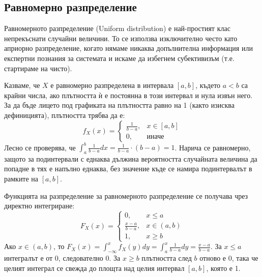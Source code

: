 \documentclass{article}
\begin{document}
\subsection{Равномерно разпределение}

Равномерното разпределение (Uniform distribution) е най-простият клас непрекъснати случайни величини. То се използва изключително често като априорно разпределение, когато нямаме никаква допълнителна информация или експертни познания за системата и искаме да избегнем субективизъм (т.е. стартираме на чисто).

Казваме, че $X$ е равномерно разпределена в интервала $[a, b]$, където $a < b$ са крайни числа, ако плътността ѝ е постоянна в този интервал и нула извън него. За да бъде лицето под графиката на плътността равно на 1 (както изисква дефиницията), плътността трябва да е:
\[
f_X(x) = \begin{cases} 
\frac{1}{b-a}, & x \in [a, b] \\ 
0, & \text{иначе} 
\end{cases}
\]
Лесно се проверява, че $\int_{a}^{b} \frac{1}{b-a} dx = \frac{1}{b-a} \cdot (b-a) = 1$.
Нарича се равномерно, защото за подинтервали с еднаква дължина вероятността случайната величина да попадне в тях е напълно еднаква, без значение къде се намира подинтервалът в рамките на $[a, b]$.

Функцията на разпределение за равномерното разпределение се получава чрез директно интегриране:
\[
F_X(x) = \begin{cases} 
0, & x \le a \\ 
\frac{x-a}{b-a}, & x \in (a, b) \\ 
1, & x \ge b 
\end{cases}
\]
Ако $x \in (a, b)$, то $F_X(x) = \int_{-\infty}^{x} f_X(y) dy = \int_{a}^{x} \frac{1}{b-a} dy = \frac{x-a}{b-a}$. 
За $x \le a$ интегралът е от 0, следователно $0$. За $x \ge b$ плътността след $b$ отново е 0, така че целият интеграл се свежда до площта над целия интервал $[a, b]$, която е 1.
\end{document}
